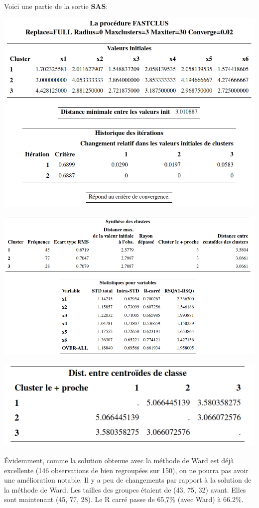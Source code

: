 \documentclass[
  11pt,
  letterpaper,
]{book}
\theoremstyle{definition}
\theoremstyle{definition}
\theoremstyle{definition}
\theoremstyle{remark}
\begin{document}
Voici une partie de la sortie \textbf{SAS}:

\begin{center}\includegraphics[width=0.7\linewidth]{figures/04-clustering-e14} \end{center}

\begin{center}\includegraphics[width=0.9\linewidth]{figures/04-clustering-e15} \end{center}

\begin{center}\includegraphics[width=0.5\linewidth]{figures/04-clustering-e16} \end{center}

Évidemment, comme la solution obtenue avec la méthode de Ward est déjà excellente (146 observations de bien regroupées sur 150), on ne pourra pas avoir une amélioration notable. Il y a peu de changements par rapport à la solution de la méthode de Ward. Les tailles des groupes étaient de (43, 75, 32) avant. Elles sont maintenant (45, 77, 28). Le R carré passe de 65,7\% (avec Ward) à 66.2\%.
\end{document}

